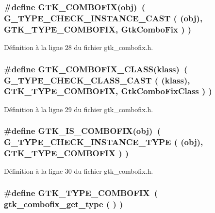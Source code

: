 \subsubsection[{GTK\_\-COMBOFIX}]{\setlength{\rightskip}{0pt plus 5cm}\#define GTK\_\-COMBOFIX(obj)~( G\_\-TYPE\_\-CHECK\_\-INSTANCE\_\-CAST ( (obj), GTK\_\-TYPE\_\-COMBOFIX, {\bf GtkComboFix} ) )}\label{gtk__combofix_8h_a6c0219bc33d6d41e2e6ddf984572c041}


Définition à la ligne 28 du fichier gtk\_\-combofix.h.

\subsubsection[{GTK\_\-COMBOFIX\_\-CLASS}]{\setlength{\rightskip}{0pt plus 5cm}\#define GTK\_\-COMBOFIX\_\-CLASS(klass)~( G\_\-TYPE\_\-CHECK\_\-CLASS\_\-CAST ( (klass),  GTK\_\-TYPE\_\-COMBOFIX, {\bf GtkComboFixClass} ) )}\label{gtk__combofix_8h_ab5236f62e497e78bf15961a7656c3082}


Définition à la ligne 29 du fichier gtk\_\-combofix.h.

\subsubsection[{GTK\_\-IS\_\-COMBOFIX}]{\setlength{\rightskip}{0pt plus 5cm}\#define GTK\_\-IS\_\-COMBOFIX(obj)~( G\_\-TYPE\_\-CHECK\_\-INSTANCE\_\-TYPE ( (obj), GTK\_\-TYPE\_\-COMBOFIX ) )}\label{gtk__combofix_8h_ae229acb083eaf65647feb13fb925cfba}


Définition à la ligne 30 du fichier gtk\_\-combofix.h.

\subsubsection[{GTK\_\-TYPE\_\-COMBOFIX}]{\setlength{\rightskip}{0pt plus 5cm}\#define GTK\_\-TYPE\_\-COMBOFIX~( gtk\_\-combofix\_\-get\_\-type ( ) )}\label{gtk__combofix_8h_a82bd55201084f88da5872b3e883f6653}


